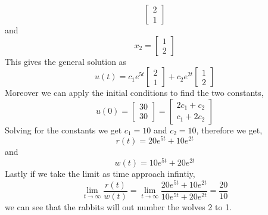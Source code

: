 \begin{enumerate}[label=\arabic*.]
\begin{mdframed}[style=MyFrame]
\begin{equation}
            \begin{bmatrix}
                2   \\
                1
            \end{bmatrix}
        \end{equation}
        and 
        \begin{equation}
            x_{2} = 
            \begin{bmatrix}
                1   \\
                2
            \end{bmatrix}
        \end{equation}
        This gives the general solution as
        \begin{equation}
            u(t) = c_{1}e^{5t}
            \begin{bmatrix}
                2   \\
                1
            \end{bmatrix}
            + c_{2}e^{2t}
            \begin{bmatrix}
                1   \\
                2
            \end{bmatrix}
        \end{equation}
        Moreover we can apply the initial conditions to find the two
        constants,
        \begin{equation}
            u(0) = 
            \begin{bmatrix}
                30  \\
                30
            \end{bmatrix}
            =
            \begin{bmatrix}
                2c_{1} + c_{2}  \\
                c_{1} + 2c_{2}
            \end{bmatrix}
        \end{equation}
        Solving for the constants we get $c_{1}=10$ and $c_{2}=10$,
        therefore we get, 
        \begin{equation}
            r(t) = 20e^{5t} + 10e^{2t} 
        \end{equation}
        and
        \begin{equation}
            w(t) = 10e^{5t} + 20e^{2t}
        \end{equation}
        Lastly if we take the limit as time approach infintiy,
        \begin{equation}
            \lim_{t \to \infty} \frac{r(t)}{w(t)}
            =
            \lim_{t \to \infty} 
                \frac{20e^{5t} + 10e^{2t}}
                {10e^{5t} + 20e^{2t}} 
                = \frac{20}{10}
        \end{equation}
        we can see that the rabbits will out number the wolves 2 to 1.
    \end{mdframed}
\end{enumerate}
